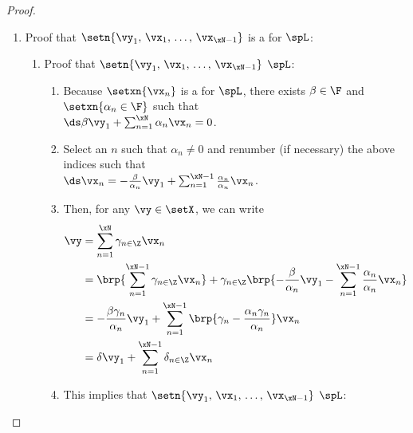 \begin{proof}
\begin{enumerate}
  \item Proof that $\setn{\vy_1,\,\vx_1,\,\ldots,\,\vx_{\xN-1}}$ is a  for $\spL$: \label{item:x1phiN1}
    \begin{enumerate}
      \item Proof that $\setn{\vy_1,\,\vx_1,\,\ldots,\,\vx_{\xN-1}}$  $\spL$:
        \begin{enumerate}
          \item Because $\setxn{\vx_n}$ is a  for $\spL$, there exists $\beta\in\F$ and $\setxn{\alpha_n\in\F}$ such that 
            \\$\ds \beta\vy_1 + \sum_{n=1}^\xN \alpha_n\vx_{n} = 0$.\label{item:frm_MN_beta}
          \item Select an $n$ such that $\alpha_n\neq0$ and renumber (if necessary) the above indices such that 
            \\$\ds\vx_{n} = -\frac{\beta}{\alpha_n}\vy_1 +  \sum_{n=1}^{\xN-1} \frac{\alpha_n}{\alpha_n}\vx_n$.
          \item Then, for any $\vy\in\setX$, we can write
            \begin{align*}
              \vy 
                &= \sum_{n=1}^\xN \gamma_{n\in\Z} \vx_n
              \\&= \brp{\sum_{n=1}^{\xN-1} \gamma_{n\in\Z} \vx_n} + \gamma_{n\in\Z} \brp{-\frac{\beta}{\alpha_n}\vy_1- \sum_{n=1}^{\xN-1} \frac{\alpha_n}{\alpha_n}\vx_n}
              \\&= -\frac{\beta\gamma_n}{\alpha_n}\vy_1 + {\sum_{n=1}^{\xN-1} \brp{\gamma_n-\frac{\alpha_n\gamma_n}{\alpha_n}} \vx_n}
              \\&= \delta\vy_1 + \sum_{n=1}^{\xN-1}\delta_{n\in\Z} \vx_n
            \end{align*}
          \item This implies that $\setn{\vy_1,\,\vx_1,\,\ldots,\,\vx_{\xN-1}}$  $\spL$:
        \end{enumerate}


\end{enumerate}
\end{enumerate}
\end{proof}
